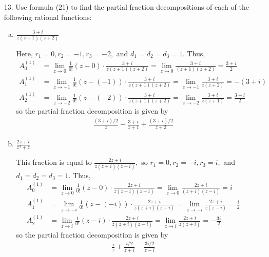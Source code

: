 \documentclass{article}
\begin{document}
\begin{itemize}
	\item[13.] Use formula (21) to find the partial fraction decompositions of each of the following rational functions:
		\begin{enumerate}[(a)]
			\item $\frac{3+i}{z(z+1)(z+2)}$
				\begin{soln}
					Here, $r_1=0, r_2=-1, r_3=-2,$ and $d_1=d_2=d_3=1.$ Thus,
					\begin{align*}
						A_0^{(1)} &=  \lim_{z\to0} \frac{1}{0!} (z-0) \cdot \frac{3+i}{z(z+1)(z+2)} = \lim_{z\to 0} \frac{3+i}{(z+1)(z+2)} = \frac{3+i}{2} \\
						A_1^{(1)} &= \lim_{z\to-1} \frac{1}{0!}(z-(-1))\cdot \frac{3+i}{z(z+1)(z+2)} = \lim_{z\to -1} \frac{3+i}{z(z+2)} = -(3+i) \\
						A_{2}^{(1)} &= \lim_{z\to-2} \frac{1}{0!} (z-(-2))\cdot \frac{3+i}{z(z+1)(z+2)} = \lim_{z\to-2} \frac{3+i}{z(z+1)} = \frac{3+i}{2}
					\end{align*}
					so the partial fraction decomposition is given by
					\begin{align*}
						\frac{(3+i)/2}{z} - \frac{3+i}{z+1} + \frac{(3+i)/2}{z+2}
					\end{align*}
				\end{soln}

			\item $\frac{2z+i}{z^3+z}$
				\begin{soln}
					This fraction is equal to $\frac{2z+i}{z(z+i)(z-i)},$ so $r_1=0, r_2=-i, r_3=i,$ and $d_1=d_2=d_3=1.$ Thus,
					\begin{align*}
						A_0^{(1)} &= \lim_{z\to 0} \frac{1}{0!} (z-0)\cdot \frac{2z+i}{z(z+i)(z-i)} = \lim_{z\to 0} \frac{2z+i}{(z+i)(z-i)} = i \\
						A_1^{(1)} &= \lim_{z\to -i} \frac{1}{0!} (z-(-i))\cdot \frac{2z+i}{z(z+i)(z-i)} = \lim_{z\to-i} \frac{2z+i}{z(z-i)} = \frac{i}{2} \\
						A_2^{(1)} &= \lim_{z\to i} \frac{1}{0!} (z-i)\cdot \frac{2z+i}{z(z+i)(z-i)} = \lim_{z\to i} \frac{2z+i}{z(z+i)} = -\frac{3i}{2}
					\end{align*}
					so the partial fraction decomposition is given by
					\begin{align*}
						\frac{i}{z} + \frac{i/2}{z+i} - \frac{3i/2}{z-i}
					\end{align*}
				\end{soln}


\end{enumerate}
\end{itemize}
\end{document}
